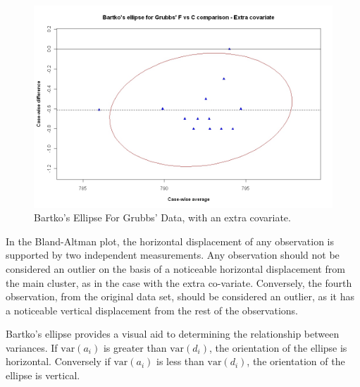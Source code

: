 \documentclass[Main.tex]{subfiles}
\begin{document}
\begin{figure}[h!]
	\includegraphics[width=130mm]{images/GrubbsBartko2.jpeg}
	\caption{Bartko's Ellipse For Grubbs' Data, with an extra covariate.}\label{GrubbsBartko2}
\end{figure}

In the Bland-Altman plot, the horizontal displacement of any observation is supported by two independent measurements. Any
observation should not be considered an outlier on the basis of a
noticeable horizontal displacement from the main cluster, as in
the case with the extra co-variate. Conversely, the fourth observation, from the original data set, should be considered an
outlier, as it has a noticeable vertical displacement from the rest of the observations.

Bartko's ellipse provides a visual aid to determining the relationship between variances. If $\mbox{var}(a_{i})$ is greater
than $\mbox{var}(d_{i})$, the orientation of the ellipse is	horizontal. Conversely if $\mbox{var}(a_{i})$ is less than
$\mbox{var}(d_{i})$, the orientation of the ellipse is vertical.
\newpage




\end{document}
